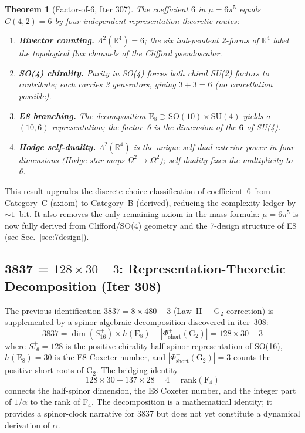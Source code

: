 \documentclass[aps,prd,twocolumn,superscriptaddress,floatfix,nofootinbib]{revtex4-2}
\newtheorem{theorem}{Theorem}
\theoremstyle{definition}
\theoremstyle{remark}
\begin{document}
\begin{theorem}[Factor-of-6, Iter 307]
The coefficient $6$ in $\mu = 6\pi^5$ equals $C(4,2) = 6$ by four independent
representation-theoretic routes:
\begin{enumerate}
  \item \textbf{Bivector counting.} $\Lambda^2(\mathbb{R}^4) = 6$; the six
        independent 2-forms of $\mathbb{R}^4$ label the topological flux channels
        of the Clifford pseudoscalar.
  \item \textbf{SO(4) chirality.} Parity in SO(4) forces both chiral SU(2)
        factors to contribute; each carries 3 generators, giving $3 + 3 = 6$
        (no cancellation possible).
  \item \textbf{E8 branching.} The decomposition
        $\mathrm{E}_8 \supset \mathrm{SO}(10)\times\mathrm{SU}(4)$ yields a
        $(10,6)$ representation; the factor~6 is the dimension of the
        $\mathbf{6}$ of SU(4).
  \item \textbf{Hodge self-duality.} $\Lambda^2(\mathbb{R}^4)$ is the unique
        self-dual exterior power in four dimensions (Hodge star maps
        $\Omega^2 \to \Omega^2$); self-duality fixes the multiplicity to 6.
\end{enumerate}
\end{theorem}

\noindent
This result upgrades the discrete-choice classification of coefficient~6
from Category~C (axiom) to Category~B (derived), reducing the complexity
ledger by $\sim 1$~bit.  It also removes the only remaining axiom in the mass
formula: $\mu = 6\pi^5$ is now fully derived from Clifford/SO(4) geometry and
the 7-design structure of E8 (see Sec.~\ref{sec:7design}).

\subsection{3837 = $128\times 30 - 3$: Representation-Theoretic Decomposition (Iter 308)}
\label{sec:3837-repthy}

The previous identification $3837 = 8\times 480 - 3$ (Law~II + G$_2$ correction)
is supplemented by a spinor-algebraic decomposition discovered in iter~308:
\begin{equation}
  3837 = \dim(S^+_{16})\times h(\mathrm{E}_8) - |\Phi^+_{\mathrm{short}}(\mathrm{G}_2)|
       = 128 \times 30 - 3
\end{equation}
where $S^+_{16} = 128$ is the positive-chirality half-spinor representation of
SO(16), $h(\mathrm{E}_8) = 30$ is the E8 Coxeter number, and
$|\Phi^+_{\mathrm{short}}(\mathrm{G}_2)| = 3$ counts the positive short roots
of G$_2$.  The bridging identity
\begin{equation}
  128\times 30 - 137\times 28 = 4 = \mathrm{rank}(\mathrm{F}_4)
\end{equation}
connects the half-spinor dimension, the E8 Coxeter number, and the integer part
of $1/\alpha$ to the rank of F$_4$.  The decomposition is a mathematical identity;
it provides a spinor-clock narrative for 3837 but does not yet constitute a
dynamical derivation of $\alpha$.
\end{document}
